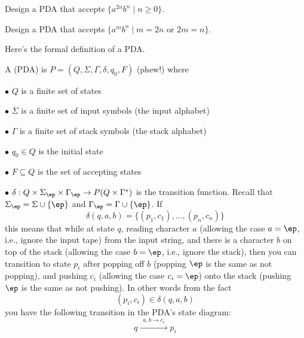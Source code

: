 \newpage
\begin{ex}
Design a PDA that accepts $\{a^{2n} b^{n} \mid n \geq 0\}$.
\end{ex}


\newpage
\begin{ex}
Design a PDA that accepts $\{a^m b^{n} \mid m = 2n \text{ or } 2m = n\}$.
\end{ex}


\newpage
Here's the formal definition of a PDA.


\begin{defn}
A  (PDA) is $P = (Q, \Sigma, \Gamma, \delta,
q_0, F)$ (phew!) where
\begin{tightlist}
\item[$\bullet$] $Q$ is a finite set of states
\item[$\bullet$] $\Sigma$ is a finite set of input symbols (the input alphabet)
\item[$\bullet$] $\Gamma$ is a finite set of stack symbols (the stack alphabet)
\item[$\bullet$] $q_0 \in Q$ is the initial state
\item[$\bullet$] $F \subseteq Q$ is the set of accepting states
\item[$\bullet$] $\delta : Q \times \Sigma_\ep \times \Gamma_\ep
\rightarrow P(Q \times \Gamma^*)$ is the transition function.
Recall that $\Sigma_\ep = \Sigma \cup \{\ep\}$ and
$\Gamma_\ep = \Gamma \cup \{\ep\}$.
If
\[
\delta(q, a, b) = \{(p_1, c_1), ..., (p_n, c_n)\}
\]
this means that while at state $q$, reading character $a$ 
(allowing the case $a = \ep$, i.e., ignore the input tape)
from the input string, and there is
a character $b$ on top of the stack (allowing the case $b = \ep$, i.e.,
ignore the stack),
then you can transition to state $p_i$ after popping off $b$
(popping $\ep$ is the same as not popping), and
pushing $c_i$ (allowing the case $c_i = \ep$) onto the stack
(pushing $\ep$ is the same as not pushing).
In other words from the fact
\[
(p_i, c_i) \in \delta(q, a, b)
\]
you have the following transition in the PDA's state diagram:
\[
q \xrightarrow{\,\,\,{a, b\rightarrow c_i}\,\,\,} p_i
\]
\end{tightlist}
\end{defn}

